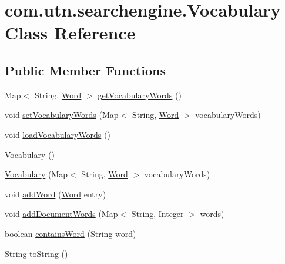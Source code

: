 \hypertarget{classcom_1_1utn_1_1searchengine_1_1_vocabulary}{\section{com.\-utn.\-searchengine.\-Vocabulary \-Class \-Reference}
\label{classcom_1_1utn_1_1searchengine_1_1_vocabulary}
}
\subsection*{\-Public \-Member \-Functions}
\begin{DoxyCompactItemize}
\item 
\-Map$<$ \-String, \hyperlink{classcom_1_1utn_1_1searchengine_1_1_word}{\-Word} $>$ \hyperlink{classcom_1_1utn_1_1searchengine_1_1_vocabulary_a34b2ee9baca77f11c23cf3b07649ca6b}{get\-Vocabulary\-Words} ()
\item 
void \hyperlink{classcom_1_1utn_1_1searchengine_1_1_vocabulary_ae9f50efd7c4406e04401d4944ee80781}{set\-Vocabulary\-Words} (\-Map$<$ \-String, \hyperlink{classcom_1_1utn_1_1searchengine_1_1_word}{\-Word} $>$ vocabulary\-Words)
\item 
void \hyperlink{classcom_1_1utn_1_1searchengine_1_1_vocabulary_abb139c8ea23882bd849a5e4fc7efecc3}{load\-Vocabulary\-Words} ()
\item 
\hyperlink{classcom_1_1utn_1_1searchengine_1_1_vocabulary_a907e85ea4723eebf01e8eda24e2aa446}{\-Vocabulary} ()
\item 
\hyperlink{classcom_1_1utn_1_1searchengine_1_1_vocabulary_af0c9f241dd9e417b744ea3470ad2f3c1}{\-Vocabulary} (\-Map$<$ \-String, \hyperlink{classcom_1_1utn_1_1searchengine_1_1_word}{\-Word} $>$ vocabulary\-Words)
\item 
void \hyperlink{classcom_1_1utn_1_1searchengine_1_1_vocabulary_a637ed8e67a9b38cb82d83916163d39e9}{add\-Word} (\hyperlink{classcom_1_1utn_1_1searchengine_1_1_word}{\-Word} entry)
\item 
void \hyperlink{classcom_1_1utn_1_1searchengine_1_1_vocabulary_ab1368538cfbf3263aa0c4a0b7b244b6e}{add\-Document\-Words} (\-Map$<$ \-String, \-Integer $>$ words)
\item 
boolean \hyperlink{classcom_1_1utn_1_1searchengine_1_1_vocabulary_a987cf76169508e0c080e815218b4a2a5}{contains\-Word} (\-String word)
\item 
\-String \hyperlink{classcom_1_1utn_1_1searchengine_1_1_vocabulary_a789ac5d184325b54fc14484c56dfd8c4}{to\-String} ()
\end{DoxyCompactItemize}


